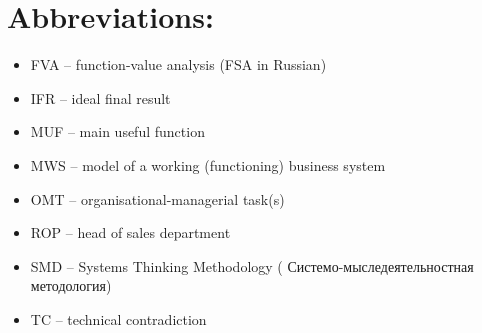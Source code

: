 \documentclass[11pt,a4paper]{book}
\begin{document}
\section{Abbreviations:}
\begin{itemize}
\item FVA -- function-value analysis (FSA in Russian)
\item IFR -- ideal final result
\item MUF -- main useful function
\item MWS -- model of a working (functioning) business system
\item OMT -- organisational-managerial task(s)
\item ROP -- head of sales department
\item SMD -- Systems Thinking Methodology
 ( \foreignlanguage{russian}{Системо-мыследеятельностная методология})
\item TC -- technical contradiction
\end{itemize}
\end{document}
